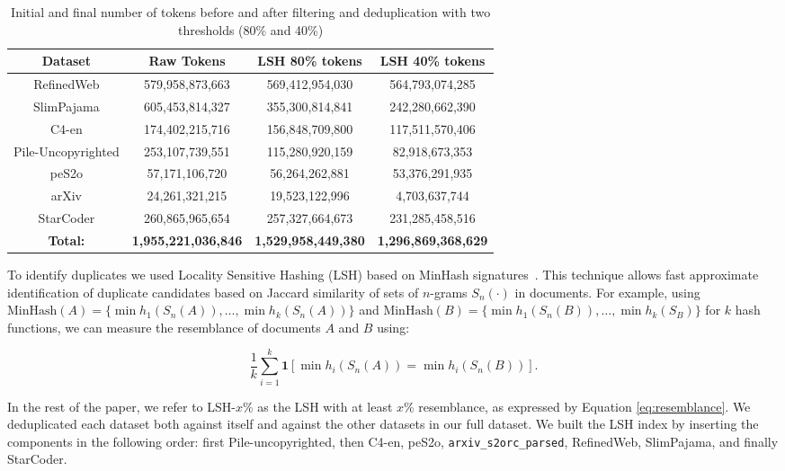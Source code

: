 \documentclass{article}
\begin{document}
\begin{table}[b]
\vspace{-4ex}
\centering
\begin{tabular}{|>{\columncolor[HTML]{EFEFEF}}c|c|c|c|}
\hline
\cellcolor[HTML]{C0C0C0}\textbf{Dataset} & \cellcolor[HTML]{C0C0C0}\textbf{Raw Tokens} & \cellcolor[HTML]{C0C0C0}\textbf{LSH 80\% tokens} & \cellcolor[HTML]{C0C0C0}\textbf{LSH 40\% tokens} \\ \hline
RefinedWeb & 579,958,873,663 & 569,412,954,030 & 564,793,074,285 \\ \hline
SlimPajama & 605,453,814,327 & 355,300,814,841 & 242,280,662,390 \\ \hline
C4-en & 174,402,215,716 & 156,848,709,800 & 117,511,570,406 \\ \hline
Pile-Uncopyrighted & 253,107,739,551 & 115,280,920,159 & 82,918,673,353 \\ \hline
peS2o & 57,171,106,720 & 56,264,262,881 & 53,376,291,935 \\ \hline
arXiv & 24,261,321,215 & 19,523,122,996 & 4,703,637,744 \\ \hline
StarCoder & 260,865,965,654 & 257,327,664,673 & 231,285,458,516 \\ \hline
\textbf{Total:} & \textbf{1,955,221,036,846} & \textbf{1,529,958,449,380} & \textbf{1,296,869,368,629} \\ \hline
\end{tabular}
\caption{\small Initial and final number of tokens before and after filtering and deduplication with two thresholds (80\% and 40\%)}
\vspace{0.2cm}
\label{tab:deduplication_token_counts}
\end{table}
To identify duplicates we used Locality Sensitive Hashing (LSH) based on MinHash signatures~\citep{broder1997minhash}. 
This technique allows fast approximate identification of duplicate candidates based on Jaccard similarity of sets of $n$-grams $S_n(\cdot)$ in documents. For example, using $\text{MinHash}(A) = \{ \min h_1(S_n(A)), \ldots, \min h_k(S_n(A)) \}$ and $\text{MinHash}(B) = \{ \min h_1(S_n(B)), \ldots, \min h_k(S_B) \}$ for $k$ hash functions, we can measure the resemblance of documents $A$ and $B$ using:

\begin{equation}
\label{eq:resemblance}
\frac{1}{k} \sum_{i=1}^k \mathbf{1}[\min h_i(S_n(A)) = \min h_i(S_n(B))].
\end{equation}

In the rest of the paper, we refer to LSH-$x$\% as the LSH with at least $x$\% resemblance, as expressed by Equation \ref{eq:resemblance}. We deduplicated each dataset both against itself and against the other datasets in our full dataset. We built the LSH index by inserting the components in the following order: first Pile-uncopyrighted, then C4-en, peS2o, \texttt{arxiv\_s2orc\_parsed}, RefinedWeb, SlimPajama, and finally StarCoder.
\end{document}

